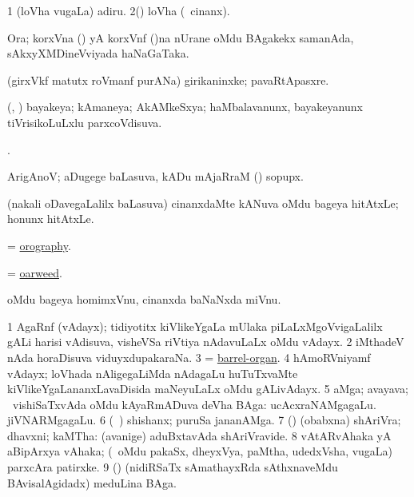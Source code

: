 \bentry
{}
\gl{\nA}
\bmng
\bnum
\num{1} (loVha \mo vugaLa) adiru. 
\num{2}(\kAparx) loVha (\kanmu\ cinanx). 
\enum
\emng
\eentry

\bentry
{}
\gl{\nA}
\bmng
Ora; korxVna () yA korxVnf ()na nUrane oMdu BAgakekx samanAda, sAkxyXMDineVviyada haNaGaTaka. 
\emng
\eentry

\bentry
{}
\gl{\nA}
\bmng
(girxVkf matutx roVmanf purANa) girikaninxke; pavaRtApasxre. 
\emng
\eentry

\bentry
{}
\gl{\gu}
\bmng
(\veYshA, \tashA) bayakeya; kAmaneya; AkAMkeSxya; haMbalavanunx, bayakeyanunx tiVrisikoLuLxlu parxcoVdisuva. 
\emng
\eentry

\bentry
{}
\gl{\saMkiSx}
\bmng
{}. 
\emng
\eentry

\bentry
{}
\gl{\nA}
\bmng
ArigAnoV; aDugege baLasuva, kADu mAjaRraM () sopupx. 
\emng
\eentry

\bentry
{}
\gl{\nA}
\bmng
(nakali oDavegaLalilx baLasuva) cinanxdaMte kANuva oMdu bageya hitAtxLe; honunx hitAtxLe. 
\emng
\eentry

\bentry
{}
\gl{\nA}
\bmng
= \hyperlink{orography}{orography}. 
\emng
\eentry

\bentry
{}
\gl{\nA}
\bmng
= \hyperlink{oarweed}{oarweed}. 
\emng
\eentry

\bentry
{}
\gl{\nA}
\bmng
oMdu bageya homimxVnu, cinanxda baNaNxda miVnu. 
\emng
\eentry

\bentry
{}
\gl{\nA}
\bmng
\bnum
\num{1} AgaRnf (vAdayx); tidiyotitx kiVlikeYgaLa mUlaka piLaLxMgoVvigaLalilx gALi harisi vAdisuva, visheVSa riVtiya nAdavuLaLx oMdu vAdayx. 
\num{2} iMthadeV nAda horaDisuva viduyxdupakaraNa. 
\num{3} = \hyperref{kandict_b.pdf}{B}{barrel-organ}{barrel-organ}. 
\num{4} hAmoRVniyamf vAdayx; loVhada nAligegaLiMda nAdagaLu huTuTxvaMte kiVlikeYgaLananxLavaDisida maNeyuLaLx oMdu gALivAdayx. 
\num{5} aMga; avayava; \sA\ vishiSaTxvAda oMdu kAyaRmADuva deVha BAga:  ucAcxraNAMgagaLu.  jiVNARMgagaLu. 
\num{6} (\kanmu\ \hA) shishanx; puruSa jananAMga. 
\num{7} (\pArxparx) (obabxna) shAriVra; dhavxni; kaMTha:  (avanige) aduBxtavAda shAriVravide. 
\num{8} vAtARvAhaka yA aBipArxya vAhaka; (\kanmu\ oMdu pakaSx, dheyxVya, paMtha, udedxVsha, \mo vugaLa) parxcAra patirxke. 
\num{9} (\pArxparx) (nidiRSaTx sAmathayxRda sAthxnaveMdu BAvisalAgidadx) meduLina BAga. 
\enum
\emng

